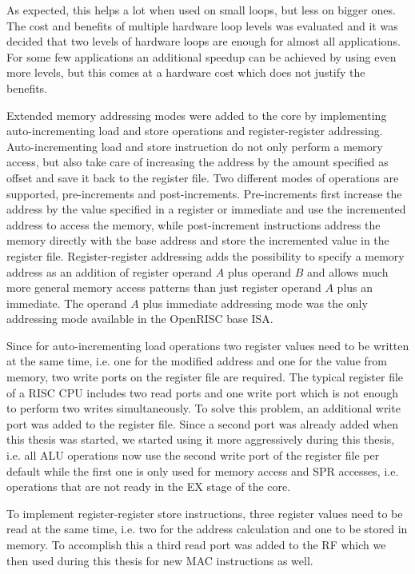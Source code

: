 As expected, this helps a lot when used on small loops, but less on
bigger ones. The cost and benefits of multiple hardware loop levels was
evaluated and it was decided that two levels of hardware loops are enough for
almost all applications. For some few applications an additional speedup can be
achieved by using even more levels, but this comes at a hardware cost which does
not justify the benefits.

Extended memory addressing modes were added to the core by implementing
auto-incrementing load and store operations and register-register addressing.
Auto-incrementing load and store instruction do not only perform a memory
access, but also take care of increasing the address by the amount specified as
offset and save it back to the register file. Two different modes of operations
are supported, pre-increments and post-increments. Pre-increments first
increase the address by the value specified in a register or immediate and use
the incremented address to access the memory, while post-increment instructions
address the memory directly with the base address and store the incremented
value in the register file.
Register-register addressing adds the possibility to specify a memory address as
an addition of register operand $A$ plus operand $B$ and allows much more
general memory access patterns than just register operand $A$ plus an immediate.
The operand $A$ plus immediate addressing mode was the only addressing mode
available in the OpenRISC base \gls{ISA}.

Since for auto-incrementing load operations two register values need to be
written at the same time, i.e. one for the modified address and one for the
value from memory, two write ports on the register file are required.
The typical register file of a \gls{RISC} CPU includes two read ports and one
write port which is not enough to perform two writes simultaneously. To solve
this problem, an additional write port was added to the register file. Since a
second port was already added when this thesis was started, we started using it
more aggressively during this thesis, i.e. all \gls{ALU} operations now use the
second write port of the register file per default while the first one is only
used for memory access and \gls{SPR} accesses, i.e. operations that are not
ready in the \gls{EX} stage of the core.

To implement register-register store instructions, three register values need
to be read at the same time, i.e. two for the address calculation and one to be
stored in memory. To accomplish this a third read port was added to the RF
which we then used during this thesis for new \gls{MAC} instructions as well.


